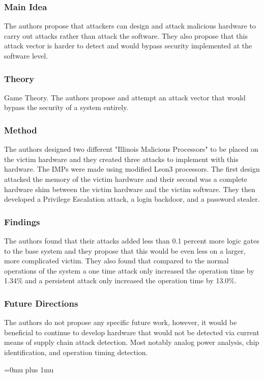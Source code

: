 \subsubsection{Main Idea}

\noindent
The authors propose that attackers can design and attack malicious hardware to carry out attacks rather than attack the software.  They also propose that this attack vector is harder to detect and would bypass security implemented at the software level.

\subsubsection{Theory}

\noindent
Game Theory.  The authors propose and attempt an attack vector that would bypass the security of a system entirely.

\subsubsection{Method}

\noindent
The authors designed two different "Illinois Malicious Processors" to be placed on the victim hardware and they created three attacks to implement with this hardware.  The IMPs were made using modified Leon3 processors.  The first design attacked the memory of the victim hardware and their second was a complete hardware shim between the victim hardware and the victim software. They then developed a Privilege Escalation attack, a login backdoor, and a password stealer.

\subsubsection{Findings}

\noindent
The authors found that their attacks added less than 0.1 percent more logic gates to the base system and they propose that this would be even less on a larger, more complicated victim.  They also found that compared to the normal operations of the system a one time attack only increased the operation time by 1.34\% and a persistent attack only increased the operation time by 13.0\%.  

\subsubsection{Future Directions}

\noindent
The authors do not propose any specific future work, however, it would be beneficial to continue to develop hardware that would not be detected via current means of supply chain attack detection.  Most notably analog power analysis, chip identification, and operation timing detection.

\Urlmuskip=0mu plus 1mu\relax
\pagebreak
